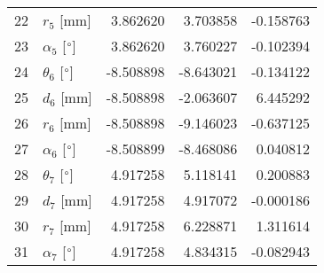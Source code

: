 \documentclass{standalone}%
\begin{document}
\begin{tabular}{llrrr}
22 &              $r_{5}$ [mm] &  3.862620 &   3.703858 &  -0.158763 \\
23 &  $\alpha_{5}$ [$\degree$] &  3.862620 &   3.760227 &  -0.102394 \\
24 &  $\theta_{6}$ [$\degree$] & -8.508898 &  -8.643021 &  -0.134122 \\
25 &              $d_{6}$ [mm] & -8.508898 &  -2.063607 &   6.445292 \\
26 &              $r_{6}$ [mm] & -8.508898 &  -9.146023 &  -0.637125 \\
27 &  $\alpha_{6}$ [$\degree$] & -8.508899 &  -8.468086 &   0.040812 \\
28 &  $\theta_{7}$ [$\degree$] &  4.917258 &   5.118141 &   0.200883 \\
29 &              $d_{7}$ [mm] &  4.917258 &   4.917072 &  -0.000186 \\
30 &              $r_{7}$ [mm] &  4.917258 &   6.228871 &   1.311614 \\
31 &  $\alpha_{7}$ [$\degree$] &  4.917258 &   4.834315 &  -0.082943 \\
\bottomrule
\end{tabular}
%
\end{document}
